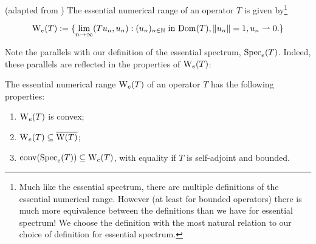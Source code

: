 \documentclass[../main.tex]{subfiles}
\begin{document}
\begin{definition}
  (adapted from \cite{fillmore1972essential})
  The essential numerical range of an operator $T$ is given by\footnote{Much like
  the essential spectrum, there are multiple definitions of the essential
  numerical range. However (at least for bounded operators) there is much
  more equivalence between the definitions than we have for essential
  spectrum! \cite{fillmore1972essential} We choose the definition with the
  most natural relation to our choice of definition for essential spectrum.}

$$\mathrm{W}_e (T) := \{\lim_{n \rightarrow \infty}( Tu_n, u_n ) 
		  : (u_n)_{n \in \mathbb{N}}\text{ in } \mathrm{Dom}(T), \|u_n\|=1,
		    u_n \rightharpoonup 0.\}$$
\end{definition}
Note the parallels with our definition of the essential spectrum, $\mathrm{Spec}_e(T)$.
Indeed, these parallels are reflected in the properties of $\mathrm{W}_e(T)$:

\begin{proposition}
\label{thm:nume-props}
  The essential numerical range $\mathrm{W}_e(T)$ of an operator $T$ has the following properties:
  \begin{enumerate}
    \item
    \label{item:nume-convex} 
      $\mathrm{W}_e(T)$ is convex;
    \item
    \label{item:nume-in-clos-num} 
      $\mathrm{W}_e(T) \subseteq \overline{\mathrm{W}(T)}$;
    \item
    \label{item:nume-is-hull} 
      $\mathrm{conv}(\mathrm{Spec}_e(T)) \subseteq \mathrm{W}_e(T)$, with equality if $T$ is self-adjoint and bounded.
\end{enumerate}
\end{proposition}
\end{document}
